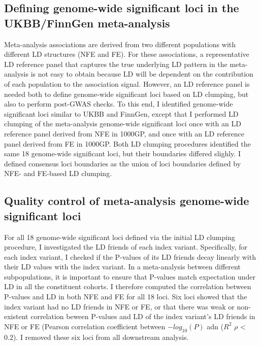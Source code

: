 \subsection{Defining genome-wide significant loci in the UKBB/FinnGen meta-analysis}
Meta-analysis associations are derived from two different populations with different LD structures (NFE and FE). 
For these associations, a  representative LD reference panel that captures the true underlying LD pattern in the meta-analysis is not easy to obtain because LD will be dependent on the contribution of each population to the association signal. However, an LD reference panel is needed both to define genome-wide significant loci based on LD clumping, but also to perform post-GWAS checks. To this end, I identified genome-wide significant loci similar to UKBB and FinnGen, except that I performed LD clumping of the meta-analysis genome-wide significant loci once with an LD reference panel derived from NFE in 1000GP, and once with an LD reference panel derived from FE in 1000GP. Both LD clumping procedures identified the same 18 genome-wide significant loci, but their boundaries differed slighly. I defined consensus loci boundaries as the union of loci boundaries defined by NFE- and FE-based LD clumping. \\

\subsection{Quality control of meta-analysis genome-wide significant loci}
For all 18 genome-wide significant loci defined via the initial LD clumping procedure, I investigated the LD friends of each index variant. Specifically, for each index variant, I checked if the P-values of its LD friends decay linearly with their LD values with the index variant. In a meta-analysis between different subpopulations, it is important to ensure that P-values match expectation under LD  in all the constituent cohorts. I therefore computed the correlation between P-values and LD in both NFE and FE for all 18 loci. Six loci showed that the index variant had no LD friends in NFE or FE, or that there was weak or non-existent correlation beween P-values and LD of the index variant's LD friends in NFE or FE (Pearson correlation coefficient between $-log_{10}(P)$ adn ($R^{2}$ $\rho$ < 0.2). I removed these six loci from all downstream analysis.









